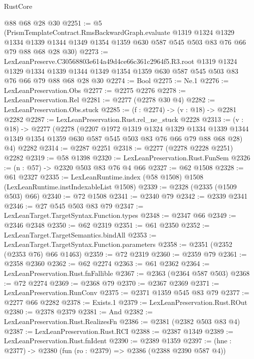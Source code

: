 \begin{lexlean}{RustCore}
\begin{coremodule}
    @88
    @68
    @28
    @30
@2251 := @5
    (PrismTemplateContract.RmsBackwardGraph.evaluate
      @1319
      @1324
      @1329
      @1334
      @1339
      @1344
      @1349
      @1354
      @1359
      @630
      @587
      @545
      @503
      @83
      @76
      @66
      @79
      @88
      @68
      @28
      @30)
@2273 := LexLeanPreserve.C30568803e614a49d4ce66c361c2964f5.R3.root
    @1319
    @1324
    @1329
    @1334
    @1339
    @1344
    @1349
    @1354
    @1359
    @630
    @587
    @545
    @503
    @83
    @76
    @66
    @79
    @88
    @68
    @28
    @30
@2274 := Bool
@2275 := Ne.{1}
@2276 := LexLeanPreservation.Obs
@2277 := @2275 @2276
@2278 := LexLeanPreservation.Rel
@2281 := @2277 (@2278 @30 @4)
@2282 := LexLeanPreservation.Obs.stuck
@2285 := (f : @2274) -> (v : @18) -> @2281 @2282
@2287 := LexLeanPreservation.Rust.rel_ne_stuck @2228
@2313 := (v : @18) ->
  @2277
    (@2278
      (@2207
        @1972
        @1319
        @1324
        @1329
        @1334
        @1339
        @1344
        @1349
        @1354
        @1359
        @630
        @587
        @545
        @503
        @83
        @76
        @66
        @79
        @88
        @68
        @28)
      @4)
    @2282
@2314 := @2287 @2251
@2318 := @2277 (@2278 @2228 @2251) @2282
@2319 := @58 @1398
@2320 := LexLeanPreservation.Rust.FunSem
@2326 := (n : @57) -> @2320 @503 @83 @76 @4 @66
@2327 := @62 @1508
@2328 := @61 @2327
@2335 := LexLeanRuntime.index (@58 @1508) @1508 (LexLeanRuntime.instIndexableList @1508)
@2339 := @2328 (@2335 (@1509 @503) @66)
@2340 := @72 @1508
@2341 := @2340 @79
@2342 := @2339 @2341
@2346 := @27 @545 @503 @83 @79
@2347 := LexLeanTarget.TargetSyntax.Function.types
@2348 := @2347 @66
@2349 := @2346 @2348
@2350 := @62 @2319
@2351 := @61 @2350
@2352 := LexLeanTarget.TargetSemantics.bindAll
@2353 := LexLeanTarget.TargetSyntax.Function.parameters
@2358 := @2351 (@2352 (@2353 @76) @66 @1463)
@2359 := @72 @2319
@2360 := @2359 @79
@2361 := @2358 @2360
@2362 := @62 @2274
@2363 := @61 @2362
@2364 := LexLeanPreservation.Rust.fnFallible
@2367 := @2363 (@2364 @587 @503)
@2368 := @72 @2274
@2369 := @2368 @79
@2370 := @2367 @2369
@2371 := LexLeanPreservation.RunConv
@2375 := @2371 @1359 @545 @83 @79
@2377 := @2277 @66 @2282
@2378 := Exists.{1}
@2379 := LexLeanPreservation.Rust.ROut
@2380 := @2378 @2379
@2381 := And
@2382 := LexLeanPreservation.Rust.RealizesFn
@2386 := @2381 (@2382 @503 @83 @4)
@2387 := LexLeanPreservation.Rust.RCI
@2388 := @2387 @1349
@2389 := LexLeanPreservation.Rust.fnIdent
@2390 := @2389 @1359
@2397 := (hne : @2377) -> @2380 (fun (ro : @2379) => @2386 (@2388 @2390 @587 @4))

\end{coremodule}
\end{lexlean}
